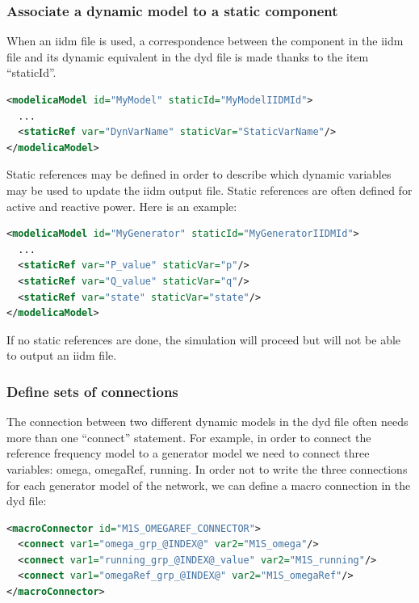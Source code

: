 \documentclass[a4paper, 12pt]{report}
\begin{document}
\subsubsection{Associate a dynamic model to a static component}

When an iidm file is used, a correspondence between the component in the iidm file and its dynamic equivalent in the dyd file is made thanks to the item ``staticId''.
\begin{lstlisting}[language=XML, morekeywords={staticId}]
<modelicaModel id="MyModel" staticId="MyModelIIDMId">
  ...
  <staticRef var="DynVarName" staticVar="StaticVarName"/>
</modelicaModel>
\end{lstlisting}

Static references may be defined in order to describe which dynamic variables may be used to update the iidm output file. Static references are often defined for active and reactive power. Here is an example:
\begin{lstlisting}[language=XML, morekeywords={staticRef}]
<modelicaModel id="MyGenerator" staticId="MyGeneratorIIDMId">
  ...
  <staticRef var="P_value" staticVar="p"/>
  <staticRef var="Q_value" staticVar="q"/>
  <staticRef var="state" staticVar="state"/>
</modelicaModel>
\end{lstlisting}

If no static references are done, the simulation will proceed but \Dynawo will not be able to output an iidm file.

\subsubsection{Define sets of connections}

The connection between two different dynamic models in the dyd file often needs more than one ``connect'' statement. For example,  in order to connect the reference frequency model to a generator model we need to connect three variables: omega, omegaRef, running. In order not to write the three connections for each generator model of the network, we can define a macro connection in the dyd file:
\begin{lstlisting}[language=XML, morekeywords={macroConnector}]
<macroConnector id="M1S_OMEGAREF_CONNECTOR">
  <connect var1="omega_grp_@INDEX@" var2="M1S_omega"/>
  <connect var1="running_grp_@INDEX@_value" var2="M1S_running"/>
  <connect var1="omegaRef_grp_@INDEX@" var2="M1S_omegaRef"/>
</macroConnector>
\end{lstlisting}
\end{document}
